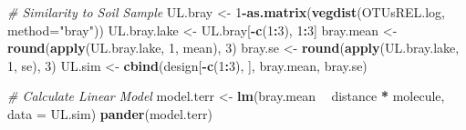 \documentclass[]{article}
\newenvironment{Shaded}{\begin{snugshade}}{\end{snugshade}}
\newcommand{\KeywordTok}[1]{\textcolor[rgb]{0.13,0.29,0.53}{\textbf{#1}}}
\newcommand{\DataTypeTok}[1]{\textcolor[rgb]{0.13,0.29,0.53}{#1}}
\newcommand{\DecValTok}[1]{\textcolor[rgb]{0.00,0.00,0.81}{#1}}
\newcommand{\StringTok}[1]{\textcolor[rgb]{0.31,0.60,0.02}{#1}}
\newcommand{\CommentTok}[1]{\textcolor[rgb]{0.56,0.35,0.01}{\textit{#1}}}
\newcommand{\OperatorTok}[1]{\textcolor[rgb]{0.81,0.36,0.00}{\textbf{#1}}}
\newcommand{\NormalTok}[1]{#1}
\begin{document}
\begin{Shaded}
\begin{Highlighting}[]
\CommentTok{# Similarity to Soil Sample}
\NormalTok{UL.bray      <-}\StringTok{ }\DecValTok{1}\OperatorTok{-}\KeywordTok{as.matrix}\NormalTok{(}\KeywordTok{vegdist}\NormalTok{(OTUsREL.log, }\DataTypeTok{method=}\StringTok{"bray"}\NormalTok{))}
\NormalTok{UL.bray.lake <-}\StringTok{ }\NormalTok{UL.bray[}\OperatorTok{-}\KeywordTok{c}\NormalTok{(}\DecValTok{1}\OperatorTok{:}\DecValTok{3}\NormalTok{), }\DecValTok{1}\OperatorTok{:}\DecValTok{3}\NormalTok{] }
\NormalTok{bray.mean    <-}\StringTok{ }\KeywordTok{round}\NormalTok{(}\KeywordTok{apply}\NormalTok{(UL.bray.lake, }\DecValTok{1}\NormalTok{, mean), }\DecValTok{3}\NormalTok{)}
\NormalTok{bray.se      <-}\StringTok{ }\KeywordTok{round}\NormalTok{(}\KeywordTok{apply}\NormalTok{(UL.bray.lake, }\DecValTok{1}\NormalTok{, se), }\DecValTok{3}\NormalTok{)}
\NormalTok{UL.sim       <-}\StringTok{ }\KeywordTok{cbind}\NormalTok{(design[}\OperatorTok{-}\KeywordTok{c}\NormalTok{(}\DecValTok{1}\OperatorTok{:}\DecValTok{3}\NormalTok{), ], bray.mean, bray.se)}

\CommentTok{# Calculate Linear Model}
\NormalTok{model.terr <-}\StringTok{ }\KeywordTok{lm}\NormalTok{(bray.mean }\OperatorTok{~}\StringTok{ }\NormalTok{distance }\OperatorTok{*}\StringTok{ }\NormalTok{molecule, }\DataTypeTok{data =}\NormalTok{ UL.sim)}
\KeywordTok{pander}\NormalTok{(model.terr)}
\end{Highlighting}
\end{Shaded}
\end{document}

